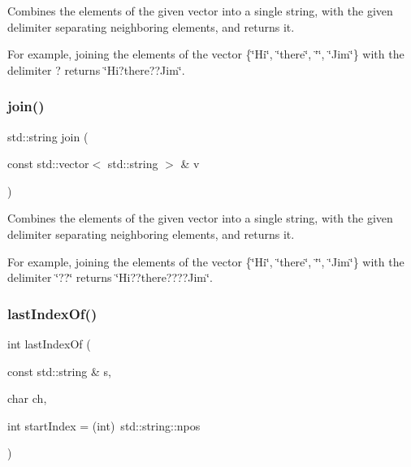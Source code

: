 Combines the elements of the given vector into a single string, with the given delimiter separating neighboring elements, and returns it. 

For example, joining the elements of the vector \{\char`\"{}\+Hi\char`\"{}, \char`\"{}there\char`\"{}, \char`\"{}\char`\"{}, \char`\"{}\+Jim\char`\"{}\} with the delimiter \textquotesingle{}?\textquotesingle{} returns \char`\"{}\+Hi?there??\+Jim\char`\"{}. \mbox{\label{namespacesgl_1_1priv_1_1strlib_a057d49d2499f5680499155e2d6b82f7a}} 
\subsubsection{\texorpdfstring{join()}{join()}\hspace{0.1cm}{\footnotesize\ttfamily [2/2]}}
{\footnotesize\ttfamily std\+::string join (\begin{DoxyParamCaption}\item[{const std\+::vector$<$ std\+::string $>$ \&}]{v }\end{DoxyParamCaption})}



Combines the elements of the given vector into a single string, with the given delimiter separating neighboring elements, and returns it. 

For example, joining the elements of the vector \{\char`\"{}\+Hi\char`\"{}, \char`\"{}there\char`\"{}, \char`\"{}\char`\"{}, \char`\"{}\+Jim\char`\"{}\} with the delimiter \char`\"{}??\char`\"{} returns \char`\"{}\+Hi??there????\+Jim\char`\"{}. \mbox{\label{namespacesgl_1_1priv_1_1strlib_a9df48773b46bf6e813faa1c60ec344ed}} 
\subsubsection{\texorpdfstring{last\+Index\+Of()}{lastIndexOf()}\hspace{0.1cm}{\footnotesize\ttfamily [1/2]}}
{\footnotesize\ttfamily int last\+Index\+Of (\begin{DoxyParamCaption}\item[{const std\+::string \&}]{s,  }\item[{char}]{ch,  }\item[{int}]{start\+Index = {\ttfamily (int)~std\+:\+:string\+:\+:npos} }\end{DoxyParamCaption})}



